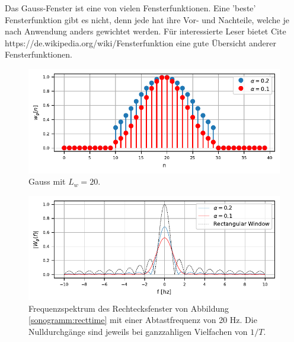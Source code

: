 Das Gauss-Fenster ist eine von vielen Fensterfunktionen. 
Eine 'beste' Fensterfunktion gibt es nicht, denn jede hat ihre Vor- und Nachteile, welche
je nach Anwendung anders gewichtet werden.
Für interessierte Leser bietet Cite https://de.wikipedia.org/wiki/Fensterfunktion eine 
gute Übersicht anderer Fensterfunktionen.
\begin{figure}
    \centering
    \includegraphics{papers/sonogramm/images/gauss_time.pdf}
    \caption{Gauss mit $L_w = 20$.
    \label{sonogramm:gausstime}
    }
\end{figure}

\begin{figure}
    \centering
    \includegraphics{papers/sonogramm/images/gauss_freq.pdf}
    \caption{Frequenzspektrum des Rechtecksfenster von Abbildung \ref{sonogramm:recttime}
    mit einer Abtastfrequenz von 20 Hz. Die Nulldurchgänge sind jeweils bei ganzzahligen Vielfachen
    von $1/T$.
    \label{sonogramm:gaussfreq}
    }
\end{figure}
